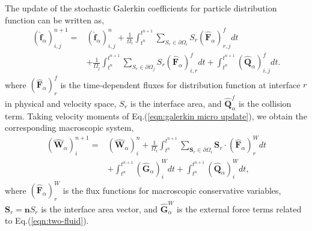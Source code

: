 \documentclass[preprint,3p,12pt,sort&compress]{elsarticle}
\begin{document}
The update of the stochastic Galerkin coefficients for particle distribution function can be written as,
\begin{equation}
\begin{aligned}
(\hat {\boldsymbol f}_\alpha)_{i,j}^{n+1}
=&(\hat {\boldsymbol f}_\alpha)_{i,j}^n+\frac{1}{\Omega_{i}}\int_{t^n}^{t^{n+1}} \sum_{S_{r} \in \partial \Omega_{i}} S_r (\hat {\boldsymbol F}_\alpha)_{r,j}^f dt \\
&+\frac{1}{\Omega_{j}}\int_{t^n}^{t^{n+1}} \sum_{S_{r} \in \partial \Omega_{j}} S_r (\hat {\boldsymbol F}_\alpha)_{i,r}^f dt
+ \int_{t^n}^{t^{n+1}} (\hat {\boldsymbol Q}_\alpha)_{i,j}^f dt .
\label{eqn:galerkin micro update}
\end{aligned}
\end{equation}
where $(\hat{\boldsymbol{F}}_\alpha)^f_r$ is the time-dependent fluxes for distribution function at interface $r$ in physical and velocity space, $S_r$ is the interface area, and $\hat{\boldsymbol Q}_\alpha^f$ is the collision term.
Taking velocity moments of Eq.(\ref{eqn:galerkin micro update}), we obtain the corresponding macroscopic system,
\begin{equation}
\begin{aligned}
(\hat {\boldsymbol{W}}_\alpha)_{i}^{n+1}
=&(\hat {\boldsymbol{W}}_\alpha)_{i}^n+\frac{1}{\Omega_{i}}\int_{t^n}^{t^{n+1}}\sum_{\mathbf S_{r} \in \partial \Omega_{i}} \mathbf{S}_{r} \cdot (\hat{\boldsymbol{F}}_{\alpha})_{r}^{W} dt \\
&+\int_{t^{n}}^{t^{n+1}}(\hat{\boldsymbol{G}}_{\alpha})_{i}^{W} d t
+\int_{t^{n}}^{t^{n+1}}(\hat{\boldsymbol{Q}}_{\alpha})_{i}^{W} d t,
\label{eqn:galerkin macro update}
\end{aligned}
\end{equation}
where $(\hat{\boldsymbol{F}}_\alpha)^W_r$ is the flux functions for macroscopic conservative variables, $\mathbf{S}_{r} =\boldsymbol{n} S_r $ is the interface area vector, and $\hat{\boldsymbol{G}}_{\alpha}^W$ is the external force terms related to Eq.(\ref {eqn:two-fluid}).
\end{document}
